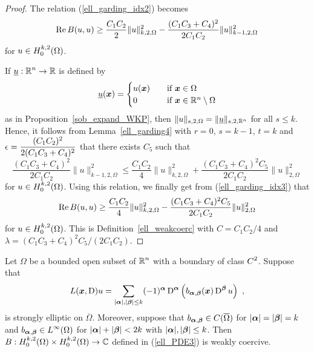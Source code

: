 \begin{proof}
The relation (\ref{ell_garding_idx2}) becomes
\begin{equation} \label{ell_garding_idx3}
\operatorname{Re} B(u,u) \geq \frac{C_1C_2}{2} \|u\|_{k,2,\Omega}^2
 - \frac{(C_1C_3 + C_4)^2}{2C_1C_2}\|u\|_{k-1,2,\Omega}^2
\end{equation}
for $\displaystyle u \in H^{k,2}_0(\Omega)$.

If $\displaystyle \underline{u}:\mathbb{R}^n\rightarrow \mathbb{R}$ is defined by
\[
\underline{u}({\bm{x}}) =
\begin{cases}
u({\bm{x}}) & \quad \text{if} \ {\bm{x}} \in \Omega \\
0 & \quad \text{if} \ {\bm{x}} \in \mathbb{R}^n \setminus \Omega
\end{cases}
\]
as in Proposition~\ref{sob_expand_WKP}, then
$\|u\|_{s,2,\Omega} = \|\underline{u}\|_{s,2,\mathbb{R}^n}$ for all
$s \leq k$.  Hence, it
follows from Lemma~\ref{ell_garding4} with $r=0$, $s=k-1$, $t=k$
and $\displaystyle \epsilon = \frac{(C_1C_2)^2}{2(C_1C_3 + C_4)^2}$ that
there exists $C_5$ such that
\[
\frac{(C_1C_3 + C_4)^2}{2C_1C_2}\|u\|_{k-1,2,\Omega}^2 \leq 
\frac{C_1C_2}{4} \|u\|_{k,2,\Omega}^2 + \frac{(C_1C_3 + C_4)^2 C_5}{2C_1C_2}
\|u\|_{2,\Omega}^2
\]
for $\displaystyle u \in H^{k,2}_0(\Omega)$.
Using this relation, we finally get from (\ref{ell_garding_idx3}) that
\[
\operatorname{Re} B(u,u) \geq \frac{C_1C_2}{4} \|u\|_{k,2,\Omega}^2
 - \frac{(C_1C_3 + C_4)^2 C_5}{2C_1C_2}\|u\|_{2,\Omega}^2
\]
for $\displaystyle u \in H^{k,2}_0(\Omega)$.
This is Definition~\ref{ell_weakcoerc} with $C=C_1C_2/4$ and
$\lambda = (C_1C_3 + C_4)^2 C_5/(2C_1C_2)$.
\end{proof}

\begin{theorem}  \label{ell_garding1}
Let $\Omega$ be a bounded open subset of $\displaystyle \mathbb{R}^n$ with a
boundary of class $\displaystyle C^2$.  Suppose that
\[
L({\bm{x}},\operatorname{D})u = \sum_{|{\bm{\alpha}}|,|{\bm{\beta}}|\leq k}
(-1)^{{\bm{\alpha}}} \operatorname{D}^{{\bm{\alpha}}}
\left( b_{{\bm{\alpha}},{\bm{\beta}}}({\bm{x}}) \operatorname{D}^{{\bm{\beta}}} u\right) \  ,
\]
is strongly elliptic on $\overline{\Omega}$.  Moreover, suppose that
$\displaystyle b_{{\bm{\alpha}},{\bm{\beta}}} \in C(\overline{\Omega})$ for
$|{\bm{\alpha}}|=|{\bm{\beta}}|=k$ and
$\displaystyle b_{{\bm{\alpha}},{\bm{\beta}}} \in L^\infty(\Omega)$ for
$|{\bm{\alpha}}|+|{\bm{\beta}}|<2k$ with $|{\bm{\alpha}}|,|{\bm{\beta}}|\leq k$.
Then
$\displaystyle B : H^{k,2}_0(\Omega) \times H^{k,2}_0(\Omega)\rightarrow \mathbb{C}$
defined in (\ref{ell_PDE3}) is weakly coercive.
\end{theorem}

